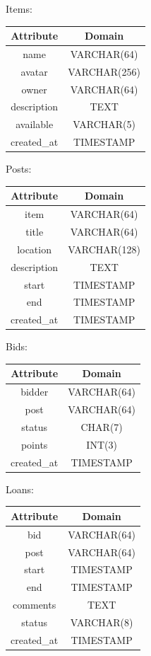 \begin{center}
Items: \quad
\begin{tabular}{|c|c|}
\hline
Attribute & Domain\\
\hline
name & VARCHAR(64)\\
avatar & VARCHAR(256) \\
owner & VARCHAR(64) \\
description & TEXT \\
available & VARCHAR(5)\\
created\_at & TIMESTAMP \\
\hline
\end{tabular}
\end{center}

\begin{center}
Posts: \quad
\begin{tabular}{|c|c|}
\hline
Attribute & Domain\\
\hline
item & VARCHAR(64)\\
title & VARCHAR(64) \\
location & VARCHAR(128) \\
description & TEXT \\
start & TIMESTAMP \\
end & TIMESTAMP \\
created\_at & TIMESTAMP \\
\hline
\end{tabular}
\end{center}

\begin{center}
Bids: \quad
\begin{tabular}{|c|c|}
\hline
Attribute & Domain\\
\hline
bidder & VARCHAR(64)\\
post & VARCHAR(64) \\
status & CHAR(7) \\
points & INT(3) \\
created\_at & TIMESTAMP \\
\hline
\end{tabular}
\end{center}

\begin{center}
Loans: \quad
\begin{tabular}{|c|c|}
\hline
Attribute & Domain\\
\hline
bid & VARCHAR(64)\\
post & VARCHAR(64) \\
start & TIMESTAMP \\
end & TIMESTAMP \\
comments & TEXT \\
status & VARCHAR(8) \\
created\_at & TIMESTAMP \\
\hline
\end{tabular}
\end{center}

